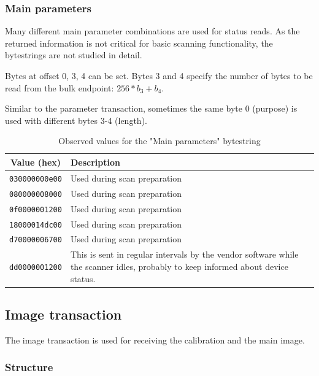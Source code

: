 \documentclass{article}
\begin{document}
\subsubsection{Main parameters}
\label{ssec:read_param}

Many different main parameter combinations are used for status reads. As the returned
information is not critical for basic scanning functionality, the bytestrings are
not studied in detail.

Bytes at offset 0, 3, 4 can be set. Bytes 3 and 4 specify the number of bytes to
be read from the bulk endpoint: $256 * b_3 + b_4$.

Similar to the parameter transaction, sometimes the same byte 0 (purpose)
is used with different bytes 3-4 (length).

\begin{table}[H]
  \caption{Observed values for the "Main parameters" bytestring}
  \centering
  \begin{tabular}{c | p{7cm}}
    Value (hex) & Description \\ \hline
    {\tt 030000000e00} & Used during scan preparation \\
    {\tt 080000008000} & Used during scan preparation \\
    {\tt 0f0000001200} & Used during scan preparation \\
    {\tt 18000014dc00} & Used during scan preparation \\
    {\tt d70000006700} & Used during scan preparation \\
    {\tt dd0000001200} & This is sent in regular intervals by the vendor software while the scanner idles,
                         probably to keep informed about device status.\\

  \end{tabular}
\end{table}

\subsection{Image transaction}

The image transaction is used for receiving the calibration and the main image.

\subsubsection{Structure}
\end{document}
